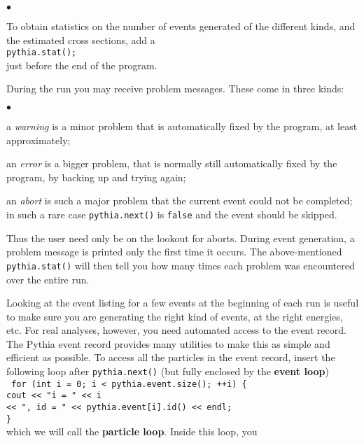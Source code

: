 \documentclass[12pt,a4paper]{article}
\newenvironment{Itemize}{\begin{list}{$\bullet$}%
{\setlength{\topsep}{0.4mm}\setlength{\partopsep}{0.4mm}%
\setlength{\itemsep}{0.4mm}\setlength{\parsep}{0.4mm}}}%
{\end{list}}
\begin{document}
\begin{Itemize}
\item To obtain statistics on the number of events generated of the 
different kinds, and the estimated cross sections, add a \\
\hspace*{10mm}\texttt{pythia.stat();}\\
just before the end of the program.
\item During the run you may receive problem messages. These come in
three kinds:
\begin{Itemize}
\item a \textit{warning} is a minor problem that is automatically fixed by 
the program, at least approximately;
\item an \textit{error} is a bigger problem, that is normally still 
automatically fixed by the program, by backing up and trying again;
\item an \textit{abort} is such a major problem that the current
 event could not be completed; in such a rare case \texttt{pythia.next()} 
is \texttt{false} and the event should be skipped.  
\end{Itemize}
Thus the user need only be on the lookout for aborts. During event
generation, a problem message is printed only the first time it occurs. 
The above-mentioned \texttt{pythia.stat()} will then tell you how many
times each problem was encountered over the entire run.
\item Looking at the event listing for a few events
at the beginning of each run is useful to make sure you are generating the
right kind of events, at the right energies, etc. For real analyses,
however, you need automated access to the event record. The Pythia event
record provides many utilities to make this as simple and efficient as
possible. To access all the particles in the event record, insert the
following loop after \texttt{pythia.next()} (but fully enclosed by the
\textbf{event loop}) \\
\texttt{
\hspace*{10mm} for (int i = 0; i < pythia.event.size(); ++i) \{ \\
\hspace*{15mm}   cout << "i = " << i \\
\hspace*{26mm}        << ", id = " << pythia.event[i].id() << endl; \\
\hspace*{10mm} \} \\
}
which we will call the \textbf{particle loop}. Inside this loop, you

\end{Itemize}
\end{document}
